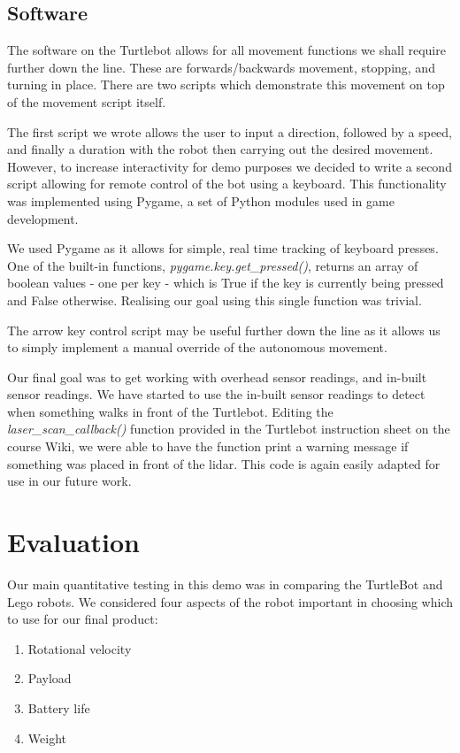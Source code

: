 \documentclass{article}
\begin{document}
\subsection{Software}

The software on the Turtlebot allows for all movement functions we shall require further down the line. These are forwards/backwards movement, stopping, and turning in place. There are two scripts which demonstrate this movement on top of the movement script itself.

The first script we wrote allows the user to input a direction, followed by a speed, and finally a duration with the robot then carrying out the desired movement. However, to increase interactivity for demo purposes we decided to write a second script allowing for remote control of the bot using a keyboard. This functionality was implemented using Pygame, a set of Python modules used in game development.

We used Pygame as it allows for simple, real time tracking of keyboard presses. One of the built-in functions, {\it pygame.key.get\_pressed()}, returns an array of boolean values - one per key - which is True if the key is currently being pressed and False otherwise. Realising our goal using this single function was trivial.

The arrow key control script may be useful further down the line as it allows us to simply implement a manual override of the autonomous movement.

Our final goal was to get working with overhead sensor readings, and in-built sensor readings. We have started to use the in-built sensor readings to detect when something walks in front of the Turtlebot. Editing the {\it laser\_scan\_callback()} function provided in the Turtlebot instruction sheet on the course Wiki, we were able to have the function print a warning message if something was placed in front of the lidar. This code is again easily adapted for use in our future work.

\section{Evaluation}
Our main quantitative testing in this demo was in comparing the TurtleBot and Lego robots. We considered four aspects of the robot important in choosing which to use for our final product:
\begin{enumerate}
\item Rotational velocity
\item Payload
\item Battery life
\item Weight
\end{enumerate}
\end{document}
